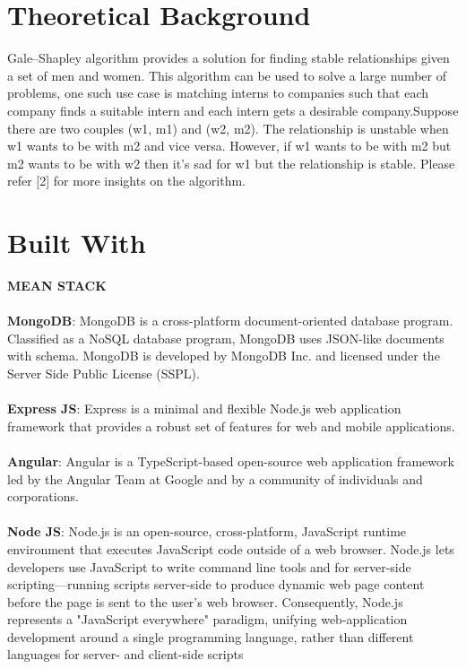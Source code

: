 \documentclass{article}
\begin{document}
\section{Theoretical Background}
Gale–Shapley algorithm provides a solution for finding stable relationships given a set of men and women. This algorithm can be used to solve a large number of problems, one such use case is matching interns to companies such that each company finds a suitable intern and each intern gets a desirable company.Suppose there are two couples (w1, m1) and (w2, m2). The relationship is unstable when w1 wants to be with m2 and vice versa. However, if w1 wants to be with m2 but m2 wants to be with w2 then it’s sad for w1 but the relationship is stable. Please refer [2] for more insights on the algorithm.





\section{Built With}
\textbf{MEAN STACK}
\\ \\
\textbf{MongoDB}: MongoDB is a cross-platform document-oriented database program. Classified as a NoSQL database program, MongoDB uses JSON-like documents with schema. MongoDB is developed by MongoDB Inc. and licensed under the Server Side Public License (SSPL).
\\ \\
\textbf{Express JS}: Express is a minimal and flexible Node.js web application framework that provides a robust set of features for web and mobile applications.
\\ \\
\textbf{Angular}: Angular is a TypeScript-based open-source web application framework led by the Angular Team at Google and by a community of individuals and corporations.
\\ \\ 
\textbf{Node JS}: Node.js is an open-source, cross-platform, JavaScript runtime environment that executes JavaScript code outside of a web browser. Node.js lets developers use JavaScript to write command line tools and for server-side scripting—running scripts server-side to produce dynamic web page content before the page is sent to the user's web browser. Consequently, Node.js represents a "JavaScript everywhere" paradigm, unifying web-application development around a single programming language, rather than different languages for server- and client-side scripts
\end{document}
